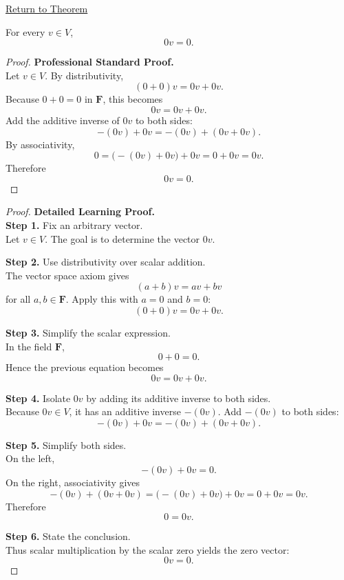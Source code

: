 
\newpage
{}
\label{prf:zero-scalar-times-vector}

\begin{remark*}[Return]
\hyperref[thm:zero-scalar-times-vector]{Return to Theorem}
\end{remark*}

\begin{theorem*}[$0v=0$]
For every $v \in V$,
\[
0v=0.
\]
\end{theorem*}

\begin{proof}
\textbf{Professional Standard Proof.}~\\
Let $v \in V$. By distributivity,
\[
(0+0)v=0v+0v.
\]
Because $0+0=0$ in $\mathbf{F}$, this becomes
\[
0v=0v+0v.
\]
Add the additive inverse of $0v$ to both sides:
\[
-(0v)+0v=-(0v)+(0v+0v).
\]
By associativity,
\[
0=\bigl(-(0v)+0v\bigr)+0v=0+0v=0v.
\]
Therefore
\[
0v=0.
\]
\end{proof}

\begin{proof}
\textbf{Detailed Learning Proof.}~\\

\textbf{Step 1.} Fix an arbitrary vector.\\
Let $v \in V$. The goal is to determine the vector $0v$.

\textbf{Step 2.} Use distributivity over scalar addition.\\
The vector space axiom gives
\[
(a+b)v=av+bv
\]
for all $a,b \in \mathbf{F}$. Apply this with $a=0$ and $b=0$:
\[
(0+0)v=0v+0v.
\]

\textbf{Step 3.} Simplify the scalar expression.\\
In the field $\mathbf{F}$,
\[
0+0=0.
\]
Hence the previous equation becomes
\[
0v=0v+0v.
\]

\textbf{Step 4.} Isolate $0v$ by adding its additive inverse to both sides.\\
Because $0v \in V$, it has an additive inverse $-(0v)$. Add $-(0v)$ to both sides:
\[
-(0v)+0v=-(0v)+(0v+0v).
\]

\textbf{Step 5.} Simplify both sides.\\
On the left,
\[
-(0v)+0v=0.
\]
On the right, associativity gives
\[
-(0v)+(0v+0v)=\bigl(-(0v)+0v\bigr)+0v=0+0v=0v.
\]
Therefore
\[
0=0v.
\]

\textbf{Step 6.} State the conclusion.\\
Thus scalar multiplication by the scalar zero yields the zero vector:
\[
0v=0.
\]
\end{proof}

